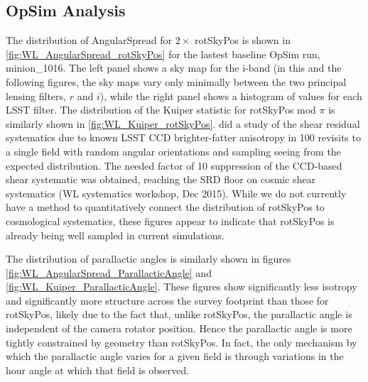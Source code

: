 \subsection{OpSim Analysis}

The distribution of AngularSpread for $2 \times$ rotSkyPos is shown in
\autoref{fig:WL_AngularSpread_rotSkyPos} for the lastest baseline OpSim run,
minion\_1016.  The left panel shows a sky map for the i-band (in this and the
following figures, the sky maps vary only minimally between the two principal
lensing filters, $r$ and $i$), while the right panel shows a histogram of values
for each LSST filter.  The distribution of the Kuiper statistic for rotSkyPos
mod $\pi$ is similarly shown in \autoref{fig:WL_Kuiper_rotSkyPos}.
\citet{Jee&Tyson2011} did a study of the shear residual systematics due to known
LSST CCD brighter-fatter anisotropy in 100 revisits to a single field with
random angular orientations and sampling seeing from the expected distribution.
The needed factor of 10 suppression of the CCD-based shear systematic was
obtained, reaching the SRD floor on cosmic shear systematics (WL systematics
workshop, Dec 2015).    While we do not currently have a method to
quantitatively connect the distribution of rotSkyPos to cosmological
systematics, these figures appear to indicate that rotSkyPos is already being
well sampled in current simulations.

The distribution of parallactic angles is similarly shown in figures
\autoref{fig:WL_AngularSpread_ParallacticAngle} and
\autoref{fig:WL_Kuiper_ParallacticAngle}.  These figures show significantly less
isotropy and significantly more structure across the survey footprint than those
for rotSkyPos, likely due to the fact that, unlike rotSkyPos, the parallactic
angle is independent of the camera rotator position.  Hence the parallactic
angle is more tightly constrained by geometry than rotSkyPos.  In fact, the only
mechanism by which the parallactic angle varies for a given field is through
variations in the hour angle at which that field is observed.






